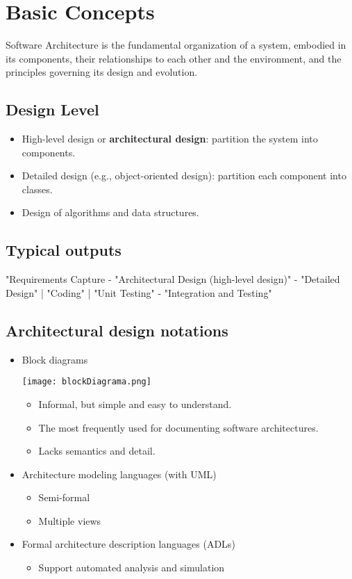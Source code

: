 \documentclass[../ESOF_notes.tex]{subfiles}
\begin{document}
\section{Basic Concepts}

Software Architecture is the fundamental organization of a system, embodied in its components, their relationships to each other and the environment, and the principles governing its design and evolution.

\subsection{Design Level}
\begin{itemize}
    \item High-level design or \textbf{architectural design}: partition the system into components.
    \item Detailed design (e.g., object-oriented design): partition each component into classes.
    \item Design of algorithms and data structures.
\end{itemize}

\subsection{Typical outputs}
"Requirements Capture - "Architectural Design (high-level design)" - "Detailed Design" | "Coding" | "Unit Testing" - "Integration and Testing"

\subsection{Architectural design notations}
\begin{itemize}
    \item Block diagrams
        
        \begin{center}            \texttt{[image: blockDiagrama.png]}
        \end{center}
        \begin{itemize}
            \item Informal, but simple and easy to understand.
            \item The most frequently used for documenting software architectures.
            \item Lacks semantics and detail.
        \end{itemize}
        
    \item Architecture modeling languages (with UML)
        \begin{itemize}
            \item Semi-formal
            \item Multiple views
        \end{itemize}
    \item Formal architecture description languages (ADLs)
        \begin{itemize}
            \item Support automated analysis and simulation
        \end{itemize}
\end{itemize}
\end{document}
